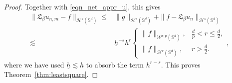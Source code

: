 \documentclass{article}
\numberwithin{equation}{section}
\def\SS{\mathbb{S}}
\begin{document}
\begin{proof}
Together with \eqref{eqn_net_appr_u}, this gives
\begin{equation}
    \begin{split}
        \|\mathfrak L_\beta u_{n,m}-f\|_{\mathcal H^s(\SS^d)}
        \leq&\|g\|_{\mathcal H^s(\SS^d)}
        +\|f-\mathfrak L_\beta u_n\|_{\mathcal H^s(\SS^d)}\\
        \lesssim&\underline h^{-s}h^r
        \left\{\begin{array}{ll}
            \|f\|_{\mathcal W^{r,p}(\SS^d)},&\frac dp<r\leq\frac d2,\\[0.3em]
            \|f\|_{\mathcal H^r(\SS^d)},&r>\frac d2.
        \end{array}\right.,
    \end{split}
\end{equation}
where we have used $\underline h\lesssim h$ to absorb the term $h^{r-s}$. This proves Theorem~\ref{thm:leastsquare}.
\end{proof}
\end{document}

